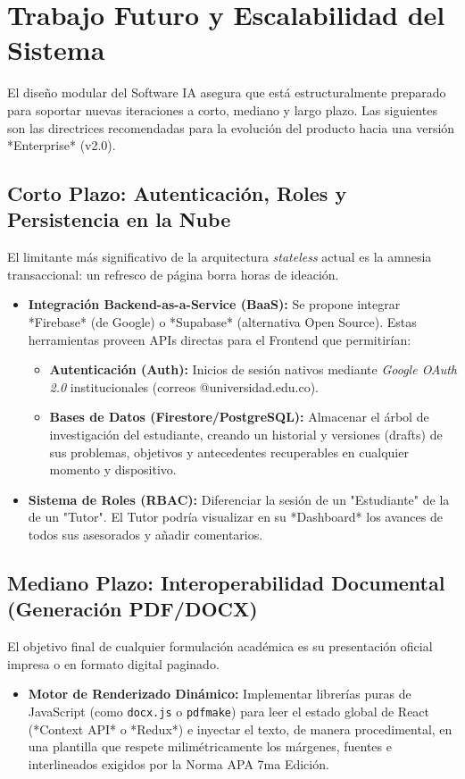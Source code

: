 \section{Trabajo Futuro y Escalabilidad del Sistema}

El diseño modular del Software IA asegura que está estructuralmente preparado para soportar nuevas iteraciones a corto, mediano y largo plazo. Las siguientes son las directrices recomendadas para la evolución del producto hacia una versión *Enterprise* (v2.0).

\subsection{Corto Plazo: Autenticación, Roles y Persistencia en la Nube}
El limitante más significativo de la arquitectura \textit{stateless} actual es la amnesia transaccional: un refresco de página borra horas de ideación.
\begin{itemize}
    \item \textbf{Integración Backend-as-a-Service (BaaS):} Se propone integrar *Firebase* (de Google) o *Supabase* (alternativa Open Source). Estas herramientas proveen APIs directas para el Frontend que permitirían:
    \begin{itemize}
        \item \textbf{Autenticación (Auth):} Inicios de sesión nativos mediante \textit{Google OAuth 2.0} institucionales (correos @universidad.edu.co).
        \item \textbf{Bases de Datos (Firestore/PostgreSQL):} Almacenar el árbol de investigación del estudiante, creando un historial y versiones (drafts) de sus problemas, objetivos y antecedentes recuperables en cualquier momento y dispositivo.
    \end{itemize}
    \item \textbf{Sistema de Roles (RBAC):} Diferenciar la sesión de un "Estudiante" de la de un "Tutor". El Tutor podría visualizar en su *Dashboard* los avances de todos sus asesorados y añadir comentarios.
\end{itemize}

\subsection{Mediano Plazo: Interoperabilidad Documental (Generación PDF/DOCX)}
El objetivo final de cualquier formulación académica es su presentación oficial impresa o en formato digital paginado.
\begin{itemize}
    \item \textbf{Motor de Renderizado Dinámico:} Implementar librerías puras de JavaScript (como \texttt{docx.js} o \texttt{pdfmake}) para leer el estado global de React (*Context API* o *Redux*) e inyectar el texto, de manera procedimental, en una plantilla que respete milimétricamente los márgenes, fuentes e interlineados exigidos por la Norma APA 7ma Edición.
\end{itemize}

